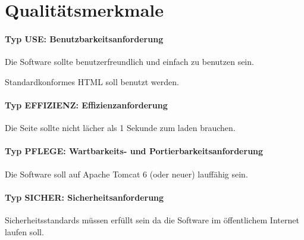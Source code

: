 \section{Qualitätsmerkmale}

\paragraph{Typ USE: Benutzbarkeitsanforderung}

\begin{asparaitem}
\item Die Software sollte benutzerfreundlich und einfach zu benutzen sein.
\item Standardkonformes HTML soll benutzt werden.
\end{asparaitem}

\paragraph{Typ EFFIZIENZ: Effizienzanforderung}

\begin{asparaitem}
\item Die Seite sollte nicht lächer als 1 Sekunde zum laden brauchen.
\end{asparaitem}

\paragraph{Typ PFLEGE: Wartbarkeits- und Portierbarkeitsanforderung}

\begin{asparaitem}
\item Die Software soll auf Apache Tomcat 6 (oder neuer) lauffähig sein.
\end{asparaitem}

\paragraph{Typ SICHER: Sicherheitsanforderung}

\begin{asparaitem}
\item Sicherheitsstandards müssen erfüllt sein da die Software im öffentlichem Internet laufen soll.
\end{asparaitem}

